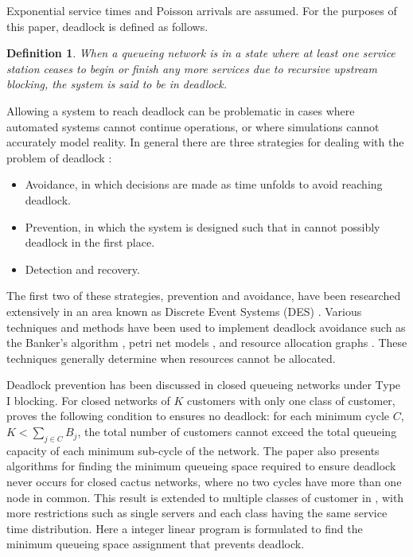 \documentclass{article}
\newtheorem{definition}{Definition}
\numberwithin{equation}{section}
\begin{document}
Exponential service times and Poisson arrivals are assumed.
For the purposes of this paper, deadlock is defined as follows.\\

\begin{definition}
    When a queueing network is in a state where at least one service
    station ceases to begin or finish any more services due to
    recursive upstream blocking, the system is said to be in deadlock.
\end{definition}


Allowing a system to reach deadlock can be problematic in cases where automated systems cannot continue operations, or where simulations cannot accurately model reality.
In general there are three strategies for dealing with the problem of deadlock \cite{kawadkaretal14, elmagarmid86}:

\begin{itemize}
  \item Avoidance, in which decisions are made as time unfolds to avoid reaching deadlock.
  \item Prevention, in which the system is designed such that in cannot possibly deadlock in the first place.
  \item Detection and recovery.
\end{itemize}

The first two of these strategies, prevention and avoidance, have been researched extensively in an area known as Discrete Event Systems (DES) \cite{reveliotis15a, reveliotis15b}. Various techniques and methods have been used to implement deadlock avoidance such as the Banker's algorithm \cite{dijkstra82, kawadkaretal14}, petri net models \cite{viswanadhametal90, ezpeletaetal02}, and resource allocation graphs \cite{belik90}.
These techniques generally determine when resources cannot be allocated.

Deadlock prevention has been discussed in closed queueing networks under Type I blocking.
For closed networks of $K$ customers with only one class of customer, \cite{kunduakyildiz89} proves the following condition to ensures no deadlock: for each minimum cycle $C$, $K < \sum_{j\in C} B_j$, the total number of customers cannot exceed the total queueing capacity of each minimum sub-cycle of the network.
The paper also presents algorithms for finding the minimum queueing space required to ensure deadlock never occurs for closed cactus networks, where no two cycles have more than one node in common.
This result is extended to multiple classes of customer in \cite{liebeherrakyildiz95}, with more restrictions such as single servers and each class having the same service time distribution.
Here a integer linear program is formulated to find the minimum queueing space assignment that prevents deadlock.
\end{document}
